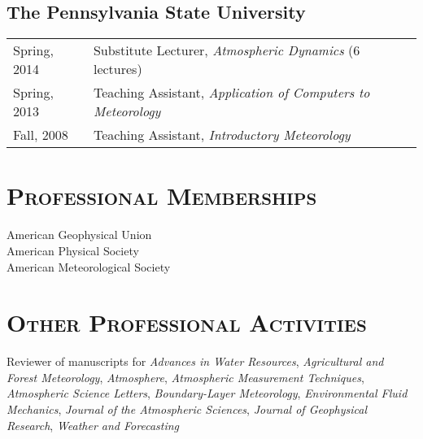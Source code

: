 \documentclass[11pt,letterpaper]{article}
\begin{document}
\subsection*{The Pennsylvania State University}

\begin{tabular}{l l}
Spring, 2014 & Substitute Lecturer, \textit{Atmospheric Dynamics} (6 lectures) \\
Spring, 2013 & Teaching Assistant, \textit{Application of Computers to Meteorology} \\
Fall, 2008 & Teaching Assistant, \textit{Introductory Meteorology} \\
\end{tabular}


\section*{\textsc{Professional Memberships}} 

American Geophysical Union \\
American Physical Society \\
American Meteorological Society 


\section*{\textsc{Other Professional Activities}} 

Reviewer of manuscripts for \textit{Advances in Water Resources},
\textit{Agricultural and Forest Meteorology},
\textit{Atmosphere},
\textit{Atmospheric Measurement Techniques},
\textit{Atmospheric Science Letters}, \textit{Boundary-Layer Meteorology},
\textit{Environmental Fluid Mechanics}, \textit{Journal of the Atmospheric
  Sciences}, \textit{Journal of Geophysical Research}, \textit{Weather and Forecasting} 
\end{document}
